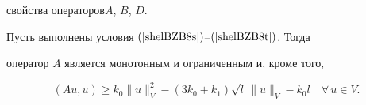 свойства операторов\linebreak $A$, $B$, $D$.





\begin{lem} \label{BZ_Izv05_L1}


Пусть выполнены условия $(\ref{shelBZB8s})$--$(\ref{shelBZB8t})$. Тогда


оператор $A$ является монотонным и ограниченным и, кроме того,


\begin{equation}


(Au,u) \geq


k_{0} \| u \|_V^2-(3 k_{0}+k_{1}) \sqrt {l} \, \| u \|_V -


k_{0} l \quad \forall \, u \in V.


\label{shelBZB8Ak}


\end{equation}


\end{lem}






